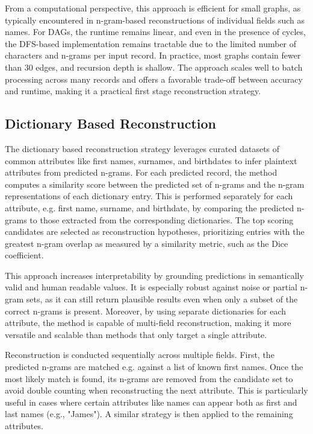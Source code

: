 From a computational perspective, this approach is efficient for small graphs, as typically encountered in n-gram-based reconstructions of individual fields such as names.
For DAGs, the runtime remains linear, and even in the presence of cycles, the DFS-based implementation remains tractable due to the limited number of characters and n-grams per input record.
In practice, most graphs contain fewer than 30 edges, and recursion depth is shallow.
The approach scales well to batch processing across many records and offers a favorable trade-off between accuracy and runtime, making it a practical first stage reconstruction strategy.

\subsection{Dictionary Based Reconstruction} \label{sec:dictrecon}

The dictionary based reconstruction strategy leverages curated datasets of common attributes like first names, surnames, and birthdates to infer plaintext attributes from predicted n-grams.
For each predicted record, the method computes a similarity score between the predicted set of n-grams and the n-gram representations of each dictionary entry.
This is performed separately for each attribute, e.g. first name, surname, and birthdate, by comparing the predicted n-grams to those extracted from the corresponding dictionaries.
The top scoring candidates are selected as reconstruction hypotheses, prioritizing entries with the greatest n-gram overlap as measured by a similarity metric, such as the Dice coefficient.

This approach increases interpretability by grounding predictions in semantically valid and human readable values.
It is especially robust against noise or partial n-gram sets, as it can still return plausible results even when only a subset of the correct n-grams is present.
Moreover, by using separate dictionaries for each attribute, the method is capable of multi-field reconstruction, making it more versatile and scalable than methods that only target a single attribute.

Reconstruction is conducted sequentially across multiple fields.
First, the predicted n-grams are matched e.g. against a list of known first names.
Once the most likely match is found, its n-grams are removed from the candidate set to avoid double counting when reconstructing the next attribute.
This is particularly useful in cases where certain attributes like names can appear both as first and last names (e.g., "James").
A similar strategy is then applied to the remaining attributes.

